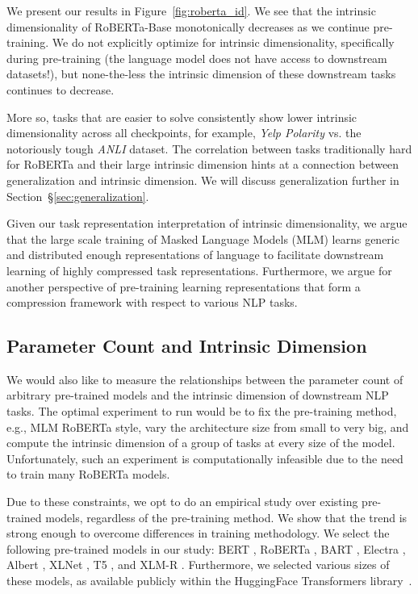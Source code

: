 \documentclass{article} %
\begin{document}
We present our results in Figure~\ref{fig:roberta_id}. We see that the intrinsic dimensionality of RoBERTa-Base monotonically decreases as we continue pre-training. We do not explicitly optimize for intrinsic dimensionality, specifically during pre-training (the language model does not have access to downstream datasets!), but none-the-less the intrinsic dimension of these downstream tasks continues to decrease.

More so, tasks that are easier to solve consistently show lower intrinsic dimensionality across all checkpoints, for example, \textit{Yelp Polarity} vs. the notoriously tough \textit{ANLI} dataset. The correlation between tasks traditionally hard for RoBERTa and their large intrinsic dimension hints at a connection between generalization and intrinsic dimension. We will discuss generalization further in Section~\S\ref{sec:generalization}.

Given our task representation interpretation of intrinsic dimensionality, we argue that the large scale training of Masked Language Models (MLM) learns generic and distributed enough representations of language to facilitate downstream learning of highly compressed task representations. Furthermore, we argue for another perspective of pre-training learning representations that form a compression framework with respect to various NLP tasks.


\subsection{Parameter Count and Intrinsic Dimension}
\label{section:parameter_exploration}
We would also like to measure the relationships between the parameter count of arbitrary pre-trained models and the intrinsic dimension of downstream NLP tasks. The optimal experiment to run would be to fix the pre-training method, e.g., MLM RoBERTa style, vary the architecture size from small to very big, and compute the intrinsic dimension of a group of tasks at every size of the model. Unfortunately, such an experiment is computationally infeasible due to the need to train many RoBERTa models.

Due to these constraints, we opt to do an empirical study over existing pre-trained models, regardless of the pre-training method. We show that the trend is strong enough to overcome differences in training methodology. We select the following pre-trained models in our study: BERT \citep{BERT}, RoBERTa \citep{ROBERTA}, BART \citep{BART}, Electra \citep{ELECTRA}, Albert \citep{ALBERT}, XLNet \citep{XLNET}, T5 \citep{T5}, and XLM-R \citep{XLMR}. Furthermore, we selected various sizes of these models, as available publicly within the HuggingFace Transformers library~\citep{huggingface}.
\end{document}
